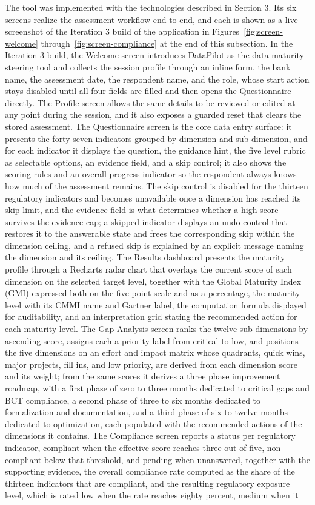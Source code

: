The tool was implemented with the technologies described in Section 3. Its six screens realize the assessment workflow end to end, and each is shown as a live screenshot of the Iteration 3 build of the application in Figures~\ref{fig:screen-welcome} through~\ref{fig:screen-compliance} at the end of this subsection. In the Iteration 3 build, the Welcome screen introduces DataPilot as the data maturity steering tool and collects the session profile through an inline form, the bank name, the assessment date, the respondent name, and the role, whose start action stays disabled until all four fields are filled and then opens the Questionnaire directly. The Profile screen allows the same details to be reviewed or edited at any point during the session, and it also exposes a guarded reset that clears the stored assessment. The Questionnaire screen is the core data entry surface: it presents the forty seven indicators grouped by dimension and sub-dimension, and for each indicator it displays the question, the guidance hint, the five level rubric as selectable options, an evidence field, and a skip control; it also shows the scoring rules and an overall progress indicator so the respondent always knows how much of the assessment remains. The skip control is disabled for the thirteen regulatory indicators and becomes unavailable once a dimension has reached its skip limit, and the evidence field is what determines whether a high score survives the evidence cap; a skipped indicator displays an undo control that restores it to the answerable state and frees the corresponding skip within the dimension ceiling, and a refused skip is explained by an explicit message naming the dimension and its ceiling. The Results dashboard presents the maturity profile through a Recharts radar chart that overlays the current score of each dimension on the selected target level, together with the Global Maturity Index (GMI) expressed both on the five point scale and as a percentage, the maturity level with its CMMI name and Gartner label, the computation formula displayed for auditability, and an interpretation grid stating the recommended action for each maturity level. The Gap Analysis screen ranks the twelve sub-dimensions by ascending score, assigns each a priority label from critical to low, and positions the five dimensions on an effort and impact matrix whose quadrants, quick wins, major projects, fill ins, and low priority, are derived from each dimension score and its weight; from the same scores it derives a three phase improvement roadmap, with a first phase of zero to three months dedicated to critical gaps and BCT compliance, a second phase of three to six months dedicated to formalization and documentation, and a third phase of six to twelve months dedicated to optimization, each populated with the recommended actions of the dimensions it contains. The Compliance screen reports a status per regulatory indicator, compliant when the effective score reaches three out of five, non compliant below that threshold, and pending when unanswered, together with the supporting evidence, the overall compliance rate computed as the share of the thirteen indicators that are compliant, and the resulting regulatory exposure level, which is rated low when the rate reaches eighty percent, medium when it 